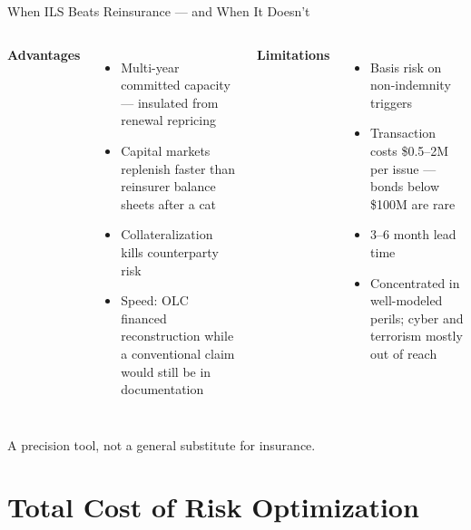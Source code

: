 \documentclass[11pt, aspectratio=169]{beamer}
\begin{document}
\begin{frame}{When ILS Beats Reinsurance --- and When It Doesn't}
\begin{columns}[T]
\textbf{Advantages}
\begin{itemize}
  \item Multi-year committed capacity --- insulated from renewal repricing
  \item Capital markets replenish faster than reinsurer balance sheets after a cat
  \item Collateralization kills counterparty risk
  \item Speed: OLC financed reconstruction while a conventional claim would still be in documentation
\end{itemize}
\textbf{Limitations}
\begin{itemize}
  \item Basis risk on non-indemnity triggers
  \item Transaction costs \$0.5--2M per issue --- bonds below \$100M are rare
  \item 3--6 month lead time
  \item Concentrated in well-modeled perils; cyber and terrorism mostly out of reach
\end{itemize}
\end{columns}
\medskip
A precision tool, not a general substitute for insurance.
\end{frame}

\section{Total Cost of Risk Optimization}
\end{document}
